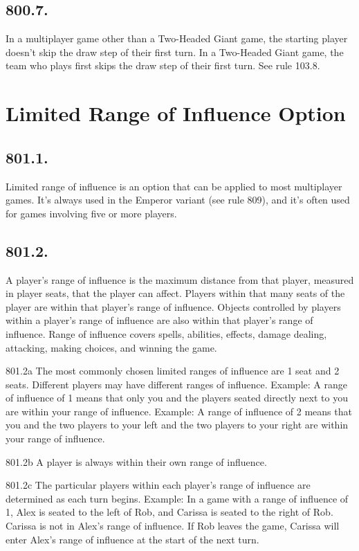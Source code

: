 \subsection*{800.7.}
In a multiplayer game other than a Two-Headed Giant game, the starting player doesn’t skip the draw step of their first turn. In a Two-Headed Giant game, the team who plays first skips the draw step of their first turn. See rule 103.8.

\section{Limited Range of Influence Option}
\subsection*{801.1.}
Limited range of influence is an option that can be applied to most multiplayer games. It’s always used in the Emperor variant (see rule 809), and it’s often used for games involving five or more players.

\subsection*{801.2.}
A player’s range of influence is the maximum distance from that player, measured in player seats, that the player can affect. Players within that many seats of the player are within that player’s range of influence. Objects controlled by players within a player’s range of influence are also within that player’s range of influence. Range of influence covers spells, abilities, effects, damage dealing, attacking, making choices, and winning the game.

801.2a The most commonly chosen limited ranges of influence are 1 seat and 2 seats. Different players may have different ranges of influence.
Example: A range of influence of 1 means that only you and the players seated directly next to you are within your range of influence.
Example: A range of influence of 2 means that you and the two players to your left and the two players to your right are within your range of influence.

801.2b A player is always within their own range of influence.

801.2c The particular players within each player’s range of influence are determined as each turn begins.
Example: In a game with a range of influence of 1, Alex is seated to the left of Rob, and Carissa is seated to the right of Rob. Carissa is not in Alex’s range of influence. If Rob leaves the game, Carissa will enter Alex’s range of influence at the start of the next turn.

